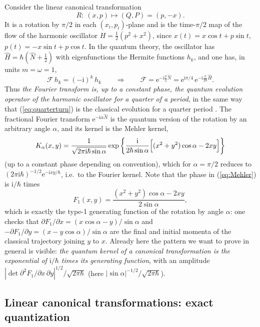 \documentclass[11pt,a4paper]{article}
\newcommand{\ii}{\mathrm{i}}
\newcommand{\ee}{\mathrm{e}}
\newcommand{\hb}{\hbar}
\newcommand{\op}[1]{\hat{#1}}
\newcommand{\FT}{\mathcal{F}}
\theoremstyle{plain}
\theoremstyle{definition}
\theoremstyle{remark}
\begin{document}
Consider the linear canonical transformation
\begin{equation}\label{eq:quarterturn}
R:\ (x,p)\longmapsto (Q,P)=(p,-x).
\end{equation}
It is a rotation by $\pi/2$ in each $(x_i,p_i)$-plane and is the time-$\pi/2$ map of the flow of the harmonic oscillator $H=\tfrac12(p^2+x^2)$, since $x(t)=x\cos t+p\sin t$, $p(t)=-x\sin t+p\cos t$. In the quantum theory, the oscillator has $\op H=\hb(\op N+\tfrac12)$ with eigenfunctions the Hermite functions $h_k$, and one has, in units $m=\omega=1$,
\begin{equation}\label{eq:FTHermite}
\FT\,h_k=(-\ii)^k\,h_k\qquad\Longrightarrow\qquad \FT=\ee^{-\ii\frac{\pi}{2}\op N}=\ee^{\ii\pi/4}\,\ee^{-\ii\frac{\pi}{2\hb}\op H}.
\end{equation}
Thus \emph{the Fourier transform is, up to a constant phase, the quantum evolution operator of the harmonic oscillator for a quarter of a period}, in the same way that (\ref{eq:quarterturn}) is the classical evolution for a quarter period \cite{Namias,Moshinsky,deGosson1}. The fractional Fourier transform $\ee^{-\ii\alpha\op N}$ is the quantum version of the rotation by an arbitrary angle $\alpha$, and its kernel is the Mehler kernel,
\begin{equation}\label{eq:Mehler}
K_\alpha(x,y)=\frac{1}{\sqrt{2\pi\ii\hb\sin\alpha}}\exp\left\{\frac{\ii}{2\hb\sin\alpha}\Bigl[(x^2+y^2)\cos\alpha-2xy\Bigr]\right\}
\end{equation}
(up to a constant phase depending on convention), which for $\alpha=\pi/2$ reduces to $(2\pi\ii\hb)^{-1/2}\ee^{-\ii xy/\hb}$, i.e.\ to the Fourier kernel. Note that the phase in (\ref{eq:Mehler}) is $\ii/\hb$ times
\begin{equation}\label{eq:F1rot}
F_1(x,y)=\frac{(x^2+y^2)\cos\alpha-2xy}{2\sin\alpha},
\end{equation}
which is exactly the type-1 generating function of the rotation by angle $\alpha$: one checks that $\partial F_1/\partial x=(x\cos\alpha-y)/\sin\alpha$ and $-\partial F_1/\partial y=(x-y\cos\alpha)/\sin\alpha$ are the final and initial momenta of the classical trajectory joining $y$ to $x$. Already here the pattern we want to prove in general is visible: \emph{the quantum kernel of a canonical transformation is the exponential of $\ii/\hb$ times its generating function}, with an amplitude $|\det\partial^2F_1/\partial x\,\partial y|^{1/2}/\sqrt{2\pi\hb}$ (here $|\sin\alpha|^{-1/2}/\sqrt{2\pi\hb}$).

\subsection{Linear canonical transformations: exact quantization}
\end{document}
